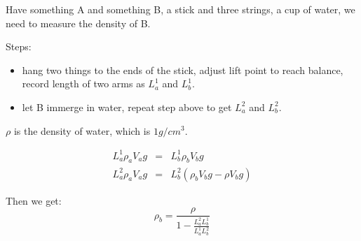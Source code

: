 \documentclass{article}
\begin{document}
Have something A and something B, a stick and three strings, a cup of
water, we need to measure the density of B.

Steps:
\begin{itemize}
    \item   hang two things to the ends of the stick, adjust lift point
to reach balance, record length of two arms as $L_a^1$ and $L_b^1$.

    \item   let B immerge in water, repeat step above to get $L_a^2$ and $L_b^2$.
\end{itemize}

$\rho$ is the density of water, which is $1g/cm^3$.

\begin{eqnarray}
L_a^1 \rho_a V_a g & = & L_b^1 \rho_b V_b g \\
L_a^2 \rho_a V_a g & = & L_b^2 (\rho_b V_b g - \rho V_b g)
\end{eqnarray}

Then we get:
\begin{equation}
\rho_b = \frac{\rho}{1-\frac{L_a^2 L_b^1}{L_a^1 L_b^2}}
\end{equation}
\end{document}
